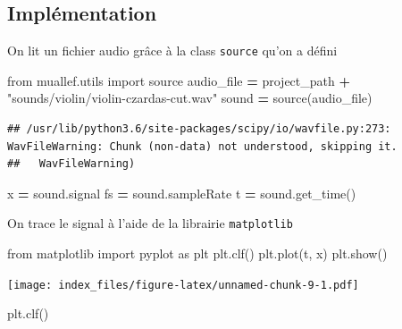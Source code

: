 \documentclass[french,]{article}
\newenvironment{Shaded}{\begin{snugshade}}{\end{snugshade}}
\newcommand{\ImportTok}[1]{#1}
\newcommand{\NormalTok}[1]{#1}
\newcommand{\OperatorTok}[1]{\textcolor[rgb]{0.81,0.36,0.00}{\textbf{#1}}}
\newcommand{\StringTok}[1]{\textcolor[rgb]{0.31,0.60,0.02}{#1}}
\begin{document}
\hypertarget{implementation}{%
\subsection{Implémentation}\label{implementation}}

On lit un fichier audio grâce à la class \texttt{source} qu'on a défini

\begin{Shaded}
\begin{Highlighting}[]
\ImportTok{from}\NormalTok{ muallef.utils }\ImportTok{import}\NormalTok{ source}
\NormalTok{audio_file }\OperatorTok{=}\NormalTok{ project_path }\OperatorTok{+} \StringTok{"sounds/violin/violin-czardas-cut.wav"}
\NormalTok{sound }\OperatorTok{=}\NormalTok{ source(audio_file)}
\end{Highlighting}
\end{Shaded}

\begin{verbatim}
## /usr/lib/python3.6/site-packages/scipy/io/wavfile.py:273: WavFileWarning: Chunk (non-data) not understood, skipping it.
##   WavFileWarning)
\end{verbatim}

\begin{Shaded}
\begin{Highlighting}[]
\NormalTok{x }\OperatorTok{=}\NormalTok{ sound.signal}
\NormalTok{fs }\OperatorTok{=}\NormalTok{ sound.sampleRate}
\NormalTok{t }\OperatorTok{=}\NormalTok{ sound.get_time()}
\end{Highlighting}
\end{Shaded}

On trace le signal à l'aide de la librairie \texttt{matplotlib}

\begin{Shaded}
\begin{Highlighting}[]
\ImportTok{from}\NormalTok{ matplotlib }\ImportTok{import}\NormalTok{ pyplot }\ImportTok{as}\NormalTok{ plt}
\NormalTok{plt.clf()}
\NormalTok{plt.plot(t, x)}
\NormalTok{plt.show()}
\end{Highlighting}
\end{Shaded}

\texttt{[image: index\_files/figure-latex/unnamed-chunk-9-1.pdf]}

\begin{Shaded}
\begin{Highlighting}[]
\NormalTok{plt.clf()}
\end{Highlighting}
\end{Shaded}
\end{document}

